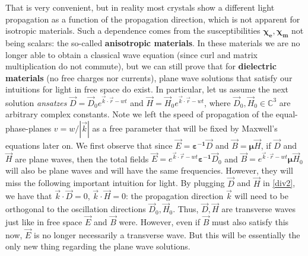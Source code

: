 \documentclass[11pt, a4paper, twoside]{article} %
\newcommand{\C}{\mathbb{C}}
\begin{document}
That is very convenient, but in reality most crystals show a different light propagation as a function of the propagation direction, which is not apparent for isotropic materials. Such a dependence comes from the susceptibilities $\pmb{\chi_e},\pmb{\chi_m}$ not being scalars: the so-called {\bf anisotropic materials}. In these materials we are no longer able to obtain a classical wave equation (since curl and matrix multiplication do not commute), but we can still prove that for {\bf dielectric materials} (no free charges nor currents), plane wave solutions that satisfy our intuitions for light in free space do exist. In particular, let us assume the next solution {\em ansatzes} $\vec{D}=\vec{D}_0e^{\vec{k}\cdot\vec{r}-wt}$ and $\vec{H}=\vec{H}_0e^{\vec{k}\cdot\vec{r}-wt}$, where $\vec{D}_0,\vec{H}_0\in\C^3$ are arbitrary complex constants. Note we left the speed of propagation of the equal-phase-planes $v=w/|\vec{k}|$ as a free parameter that will be fixed by Maxwell's equations later on. We first observe that since $\vec{E}=\pmb{\varepsilon^{-1}}\vec{D}$ and $\vec{B}=\pmb{\mu}\vec{H}$, if $\vec{D}$ and $\vec{H}$ are plane waves, then the total fields $\vec{E}=e^{\vec{k}\cdot\vec{r}-wt}\pmb{\varepsilon^{-1}}\vec{D}_0$ and $\vec{B}=e^{\vec{k}\cdot\vec{r}-wt}\pmb{\mu}\vec{H}_0$ will also be plane waves and will have the same frequencies. However, they will miss the following important intuition for light. By plugging $\vec{D}$ and $\vec{H}$ in \eqref{div2}, we have that $\vec{k}\cdot\vec{D}=0$,  $\vec{k}\cdot\vec{H}=0$: the propagation direction $\vec{k}$ will need to be orthogonal to the oscillation directions $\vec{D}_0,\vec{H}_0$. Thus, $\vec{D},\vec{H}$ are transverse waves just like in free space $\vec{E}$ and $\vec{B}$ were. However, even if $\vec{B}$ must also satisfy this now, $\vec{E}$ is no longer necessarily a transverse wave. But this will be essentially the only new thing regarding the plane wave solutions.
\end{document}
